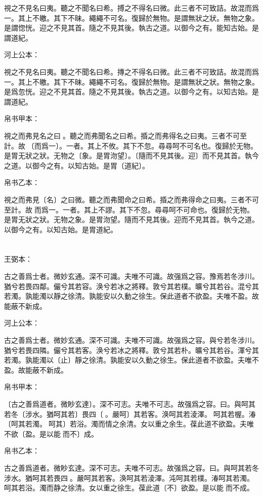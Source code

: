 \documentclass[a5paper]{ctexbook}
\begin{document}
    視之不見名曰夷。聽之不聞名曰希。搏之不得名曰微。此三者不可致詰。故混而爲一。其上不皦。其下不昧。繩繩不可名。復歸於無物。是謂無狀之狀。無物之象。是謂惚恍。迎之不見其首。隨之不見其後。執古之道。以御今之有。能知古始。是謂道紀。

    河上公本：

    視之不見名曰夷。聽之不聞名曰希。摶之不得名曰微。此三者不可致詰。故混而爲一。其上不皦。其下不昧。繩繩不可名。復歸於無物。是謂無狀之狀。無物之象。是爲忽恍。迎之不見其首。隨之不見其後。執古之道。以御今之有。以知古始。是謂道紀。

    帛书甲本：

    視之而弗見名之曰󱁚。聽之而弗聞名之曰希。捪之而弗得名之曰夷。三者不可至計。故𡇯〔而爲一〕。一者。其上不攸。其下不忽。尋尋呵不可名也。復歸於无物。是胃无狀之狀。无物之〔象。是胃沕望〕。〔隨而不見其後。迎〕而不見其首。執今之道。以御今之有。以知古始。是胃〔道紀〕。

    帛书乙本：

    視之而弗見〔名〕之曰微。聽之而弗聞命之曰希。捪之而弗得命之曰夷。三者不可至計。故𦀲而爲一。一者。其上不謬。其下不忽。尋尋呵不可命也。復歸於无物。是胃无狀之狀。无物之象。是胃沕望。隨而不見其後。迎而不見其首。執今之道。以御今之有。以知古始。是胃道紀。

    \chapter{}
    王弼本：

    古之善爲士者。微妙玄通。深不可識。夫唯不可識。故强爲之容。豫焉若冬涉川。猶兮若畏四鄰。儼兮其若容。涣兮若冰之將釋。敦兮其若樸。曠兮其若谷。混兮其若濁。孰能濁以靜之徐清。孰能安以久動之徐生。保此道者不欲盈。夫唯不盈。故能蔽不新成。

    河上公本：

    古之善爲士者。微妙玄通。深不可識。夫唯不可識。故强爲之容。與兮若冬涉川。猶兮若畏四隣。儼兮其若客。涣兮若冰之將釋。敦兮其若朴。曠兮其若谷。渾兮其若濁。孰能濁以〔止〕靜之徐清。孰能安以久動之徐生。保此道者不欲盈。夫唯不盈。故能蔽不新成。

    帛书甲本：

    〔古之善爲道者。微眇玄達〕。深不可志。夫唯不可志。故强爲之容。曰。與呵其若冬〔涉水。猶呵其若〕畏四〔𠳵。嚴呵〕其若客。涣呵其若淩澤。󱁜呵其若楃。湷〔呵其若濁。𣼥呵其〕若浴。濁而情之余清。女以重之余生。葆此道不欲盈。夫唯不欲〔盈。是以能𧝬而不〕成。

    帛书乙本：

    古之善爲道者。微眇玄達。深不可志。夫唯不可志。故强爲之容。曰。與呵其若冬涉水。猶呵其若畏四𠳵。嚴呵其若客。涣呵其若淩澤。沌呵其若樸。湷呵其若濁。𣼥呵其若浴。濁而静之徐清。女以重之徐生。葆此道〔不〕欲盈。是以能𧝬而不成。
\end{document}
